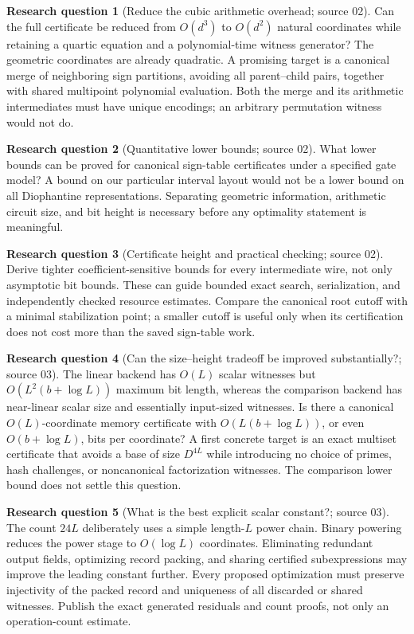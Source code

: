 \documentclass[11pt,a4paper]{article}
\theoremstyle{definition}
\newtheorem{question}[question]{Research question}
\theoremstyle{remark}
\begin{document}
\begin{question}[Reduce the cubic arithmetic overhead; source 02]
Can the full certificate be reduced from $O(d^3)$ to $O(d^2)$ natural
coordinates while retaining a quartic equation and a polynomial-time
witness generator? The geometric coordinates are already quadratic.
A promising target is a canonical merge of neighboring sign partitions,
avoiding all parent--child pairs, together with shared multipoint
polynomial evaluation. Both the merge and its arithmetic intermediates
must have unique encodings; an arbitrary permutation witness would not do.
\end{question}

\begin{question}[Quantitative lower bounds; source 02]
What lower bounds can be proved for canonical sign-table certificates
under a specified gate model? A bound on our particular interval layout
would not be a lower bound on all Diophantine representations. Separating
geometric information, arithmetic circuit size, and bit height is necessary
before any optimality statement is meaningful.
\end{question}

\begin{question}[Certificate height and practical checking; source 02]
Derive tighter coefficient-sensitive bounds for every intermediate wire,
not only asymptotic bit bounds. These can guide bounded exact search,
serialization, and independently checked resource estimates. Compare the
canonical root cutoff with a minimal stabilization point; a smaller cutoff
is useful only when its certification does not cost more than the saved
sign-table work.
\end{question}

\begin{question}[Can the size--height tradeoff be improved substantially?; source 03]
The linear backend has $O(L)$ scalar witnesses but
$O(L^2(b+\log L))$ maximum bit length, whereas the comparison backend has near-linear
scalar size and essentially input-sized witnesses. Is there a canonical
$O(L)$-coordinate memory certificate with $O(L(b+\log L))$, or even
$O(b+\log L)$, bits per coordinate? A first concrete target is an exact
multiset certificate that avoids a base of size $D^{4L}$ while introducing no
choice of primes, hash challenges, or noncanonical factorization witnesses.
The comparison lower bound does not settle this question.
\end{question}

\begin{question}[What is the best explicit scalar constant?; source 03]
The count $24L$ deliberately uses a simple length-$L$ power chain. Binary
powering reduces the power stage to $O(\log L)$ coordinates. Eliminating
redundant output fields, optimizing record packing, and sharing certified
subexpressions may improve the leading constant further. Every proposed
optimization must preserve injectivity of the packed record and uniqueness of
all discarded or shared witnesses. Publish the exact generated residuals and
count proofs, not only an operation-count estimate.
\end{question}
\end{document}
